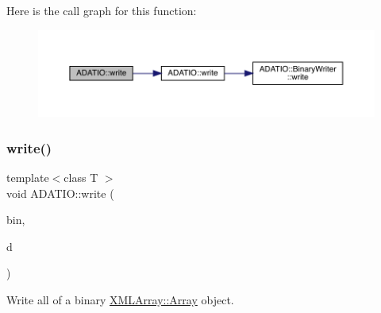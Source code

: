 Here is the call graph for this function\+:\nopagebreak
\begin{figure}[H]
\begin{center}
\leavevmode
\includegraphics[width=350pt]{d0/dba/namespaceADATIO_a4d080cdbb3d8b34b2e8cf03001f8b7f0_cgraph}
\end{center}
\end{figure}
\mbox{\label{namespaceADATIO_a70c8ce102a5eca8961bb57bf7b8b6bd1}} 
\subsubsection{\texorpdfstring{write()}{write()}\hspace{0.1cm}{\footnotesize\ttfamily [15/25]}}
{\footnotesize\ttfamily template$<$class T $>$ \\
void A\+D\+A\+T\+I\+O\+::write (\begin{DoxyParamCaption}\item[{\mbox{\hyperlink{classADATIO_1_1BinaryWriter}{Binary\+Writer}} \&}]{bin,  }\item[{const \mbox{\hyperlink{classXMLArray_1_1Array}{X\+M\+L\+Array\+::\+Array}}$<$ T $>$ \&}]{d }\end{DoxyParamCaption})\hspace{0.3cm}{\ttfamily [inline]}}



Write all of a binary \mbox{\hyperlink{classXMLArray_1_1Array}{X\+M\+L\+Array\+::\+Array}} object. 

